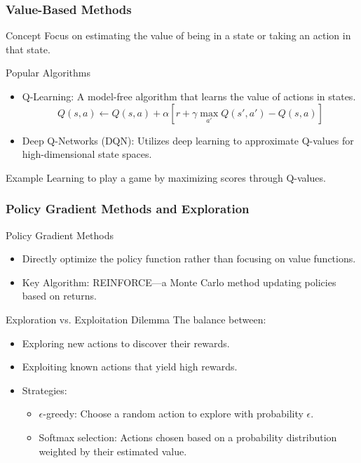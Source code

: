 \documentclass[aspectratio=169]{beamer}
\begin{document}
\begin{frame}[fragile]
    \frametitle{Value-Based Methods}
    \begin{block}{Concept}
        Focus on estimating the value of being in a state or taking an action in that state.
    \end{block}
    \begin{block}{Popular Algorithms}
        \begin{itemize}
            \item Q-Learning: A model-free algorithm that learns the value of actions in states.
            \begin{equation}
                Q(s, a) \leftarrow Q(s, a) + \alpha \left[ r + \gamma \max_{a'} Q(s', a') - Q(s, a) \right]
            \end{equation}
            \item Deep Q-Networks (DQN): Utilizes deep learning to approximate Q-values for high-dimensional state spaces.
        \end{itemize}
    \end{block}
    \begin{block}{Example}
        Learning to play a game by maximizing scores through Q-values.
    \end{block}
\end{frame}

\begin{frame}[fragile]
    \frametitle{Policy Gradient Methods and Exploration}
    \begin{block}{Policy Gradient Methods}
        \begin{itemize}
            \item Directly optimize the policy function rather than focusing on value functions.
            \item Key Algorithm: REINFORCE—a Monte Carlo method updating policies based on returns.
        \end{itemize}
    \end{block}
    \begin{block}{Exploration vs. Exploitation Dilemma}
        The balance between:
        \begin{itemize}
            \item Exploring new actions to discover their rewards.
            \item Exploiting known actions that yield high rewards.
        \end{itemize}
        \begin{itemize}
            \item Strategies: 
            \begin{itemize}
                \item $\epsilon$-greedy: Choose a random action to explore with probability $\epsilon$.
                \item Softmax selection: Actions chosen based on a probability distribution weighted by their estimated value.
            \end{itemize}
        \end{itemize}
    \end{block}
\end{frame}
\end{document}
